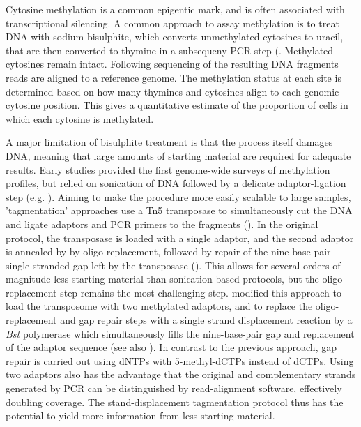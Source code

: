 \documentclass[12pt,longbibliography]{article}
\begin{document}
Cytosine methylation is a common epigentic mark, and is often associated with transcriptional silencing.
A common approach to assay methylation is to treat DNA with sodium bisulphite, which converts unmethylated cytosines to uracil, that are then converted to thymine in a subsequeny PCR step (\cite{clark1994high}.
Methylated cytosines remain intact.
Following sequencing of the resulting DNA fragments reads are aligned to a reference genome.
The methylation status at each site is determined based on how many thymines and cytosines align to each genomic cytosine position.
This gives a quantitative estimate of the proportion of cells in which each cytosine is methylated.

A major limitation of bisulphite treatment is that the process itself damages DNA, meaning that large amounts of starting material are required for adequate results.
Early studies provided the first genome-wide surveys of methylation profiles, but relied on sonication of DNA followed by a delicate adaptor-ligation step (e.g. \cite{meissner2005reduced, cokus2008shotgun, lister2009human}).
Aiming to make the procedure more easily scalable to large samples, 'tagmentation' approaches use a Tn5 transposase to simultaneously cut the DNA and ligate adaptors and PCR primers to the fragments (\cite{wang2013tagmentation}).
In the original protocol, the transposase is loaded with a single adaptor, and the second adaptor is annealed by by oligo replacement, followed by repair of the nine-base-pair single-stranded gap left by the transposase (\cite{adey2012ultra}).
This allows for several orders of magnitude less starting material than sonication-based protocols, but the oligo-replacement step remains the most challenging step.
\textcite{lu2015improved} modified this approach to load the transposome with two methylated adaptors, and to replace the oligo-replacement and gap repair steps with a single strand displacement reaction by a \textit{Bst} polymerase which simultaneously fills the nine-base-pair gap and replacement of the adaptor sequence (see also \cite{weichenhan2018tagmentation, suzuki2018whole}).
In contrast to the previous approach, gap repair is carried out using dNTPs with 5-methyl-dCTPs instead of dCTPs.
Using two adaptors also has the advantage that the original and complementary strands generated by PCR can be distinguished by read-alignment software, effectively doubling coverage. 
The stand-displacement tagmentation protocol thus has the potential to yield more information from less starting material.
\end{document}
